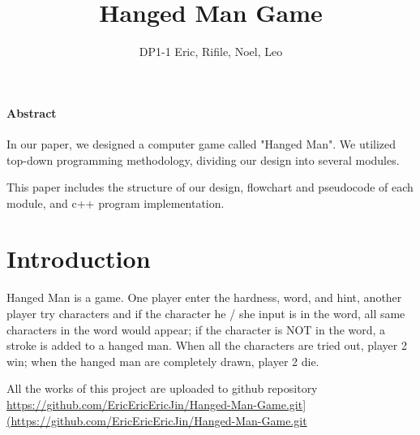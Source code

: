 \documentclass{article}
\title{Hanged Man Game}
\author{DP1-1 Eric, Rifile, Noel, Leo}
\begin{document}
    \setlength{\parindent}{0em}

    \maketitle
    \paragraph{Abstract}
    In our paper, we designed a computer game called "Hanged Man". We utilized top-down programming methodology, dividing our design into several modules. 
    
    This paper includes the structure of our design, flowchart and pseudocode of each module, and c++ program implementation.

    \newpage

    \tableofcontents
    \newpage

    \section{Introduction}
        Hanged Man is a game. One player enter the hardness, word, and hint, another player try characters and if the character he / she input is in the word, all same characters in the word would appear; if the character is NOT in the word, a stroke is added to a hanged man. When all the characters are tried out, player 2 win; when the hanged man are completely drawn, player 2 die.

        All the works of this project are uploaded to github repository \url{https://github.com/EricEricEricJin/Hanged-Man-Game.git](https://github.com/EricEricEricJin/Hanged-Man-Game.git}
    
    \newpage
\end{document}

